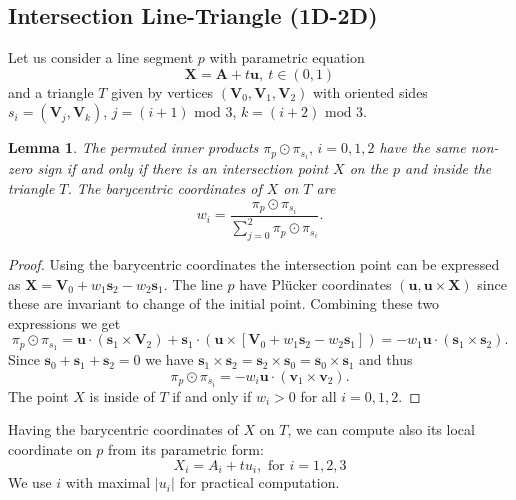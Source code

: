 \documentclass{elsarticle}
\newtheorem{lemma}[theorem]{Lemma}
\def\vc#1{\mathbf{\boldsymbol{#1}}}     %
\newcommand{\plucker}{Pl\"{u}cker }
\begin{document}

\subsection{Intersection Line-Triangle (1D-2D)}
Let us consider a line segment $p$ with parametric equation 
\begin{equation}
    \label{eq:line_parametric}
    \vc X = \vc A + t\vc u,\ t\in (0,1)
\end{equation}
and a triangle $T$ given by vertices $(\vc V_0, \vc V_1, \vc V_2)$ 
with oriented sides $s_i=(\vc V_j, \vc V_k)$, $j=(i+1)\text{ mod }3$, $k=(i+2)\text{ mod }3$. 
\begin{lemma}
The permuted inner products $\pi_p \odot \pi_{s_i},\, i=0,1,2$ have the same non-zero sign if and only if there
is an intersection point $X$ on the $p$ and inside the triangle $T$. 
The barycentric coordinates of $X$ on $T$ are
\begin{equation}
  \label{eq:bary_centric}
   w_i = \frac{\pi_p \odot \pi_{s_i}}{ \sum_{j=0}^{2} \pi_p \odot \pi_{s_i} }.
\end{equation}
\end{lemma}
\begin{proof}
Using the barycentric coordinates the intersection point can be expressed as $\vc X = \vc V_0 + w_1 \vc s_2 - w_2 \vc s_1$.
The line $p$ have \plucker coordinates $(\vc u, \vc u \times \vc X)$ since these are invariant to change of the initial point. 
Combining these two expressions we get
\[
   \pi_p \odot \pi_{s_1} = \vc u \cdot (\vc s_1 \times \vc V_2) + \vc s_1 \cdot ( \vc u \times [\vc V_0 + w_1\vc s_2 - w_2 \vc s_1])
   =-w_1 \vc u \cdot (\vc s_1 \times \vc s_2).
\]
Since $\vc s_0 + \vc s_1 + \vc s_2=0$ we have $ \vc s_1 \times \vc s_2 = \vc s_2 \times \vc s_0 = \vc s_0 \times \vc s_1$ and thus
\[
   \pi_p \odot \pi_{s_i} = -w_i \vc u \cdot (\vc v_1 \times \vc v_2).
\]
The point $X$ is inside of $T$ if and only if $w_i>0$ for all $i=0,1,2$.
\end{proof}
Having the barycentric coordinates of $X$ on $T$, we can compute also its local coordinate on $p$ from its parametric form:
\begin{equation}
   \label{eq:line}
   X_i  = A_i + t u_i, \text{ for } i=1,2,3
\end{equation}
We use $i$ with maximal $|u_i|$ for practical computation. 
\end{document}

